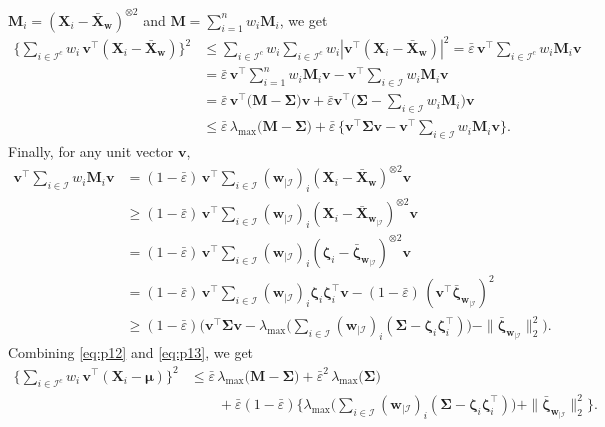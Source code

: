 \documentclass[aos,preprint,reqno]{imsart}
\newcommand\bs{\boldsymbol}
\newcommand\bmu{\boldsymbol\mu}
\newcommand\bzeta{\boldsymbol\zeta}
\newcommand\bSigma{\boldsymbol\Sigma}
\newcommand\bv{\boldsymbol v}
\newcommand\bw{\boldsymbol w}
\theoremstyle{plain}
\theoremstyle{remark}
\begin{document}
	$\mathbf M_i = (\bs X_i-\bar{\bs X}_{\bw})^{\otimes 2}$ and 
	$\mathbf M = \sum_{i=1}^n w_i\mathbf M_i$, we get
	\begin{align}
			\bigg\{\sum_{i\in\mathcal I^c} w_i\,\bv^\top(\bs X_i-\bar{\bs X}_{\bw})\bigg\}^2
			&\le \sum_{i\in\mathcal I^c} w_i\sum_{i\in\mathcal I^c} w_i|
				\bv^\top(\bs X_i-\bar{\bs X}_{\bw})|^2
			=\bar\varepsilon\, \bv^\top\sum_{i\in\mathcal I^c} w_i\mathbf{M}_i\bv\\
			&=\bar\varepsilon\,\bv^\top\sum_{i=1}^n w_i\mathbf{M}_i\bv-
			\bv^\top\sum_{i\in\mathcal I} w_i\mathbf{M}_i\bv\\
			&={\bar\varepsilon}\,\bv^\top\big(\mathbf{M} - \bSigma\big)\bv +
			{\bar\varepsilon}\bv^\top\Big(\bSigma-\sum_{i\in\mathcal I} w_i
			\mathbf{M}_i\Big)\bv\\
			&\le \bar\varepsilon\,\lambda_{\max}\big( \mathbf{M}-\bSigma\big)
			+ \bar\varepsilon\,\Big\{\bv^\top\bSigma\bv - 
			\bv^\top\sum_{i\in\mathcal I} w_i\mathbf{M}_i\bv\Big\}.
			\label{eq:p12}
	\end{align}
	Finally, for any unit vector $\bv$,
	\begin{align}
			\bv^\top\sum_{i\in\mathcal I} w_i\mathbf{M}_i \bv &= (1-\bar\varepsilon)
			\,\bv^\top\sum_{i\in\mathcal I} (\bw_{|\mathcal I})_i(\bs X_i-\bar{\bs X}_{\bw})^{\otimes 2}\bv\\
			&\ge(1-\bar\varepsilon)\,\bv^\top\sum_{i\in\mathcal I} (\bw_{|\mathcal I})_i
			(\bs X_i-\bar{\bs X}_{\bw_{|\mathcal I}})^{\otimes 2}\bv\\
			& = (1-\bar\varepsilon)\,\bv^\top\sum_{i\in\mathcal I} (\bw_{|\mathcal I})_i
			(\bzeta_i-\bar{\bzeta}_{\bw_{|\mathcal I}})^{\otimes 2}\bv\\
			&= (1-\bar\varepsilon)\,\bv^\top\sum_{i\in\mathcal I} (\bw_{|\mathcal I})_i
				\bzeta_i\bzeta_i^\top\bv-(1-\bar\varepsilon)\,
				(\bv^\top\bar{\bzeta}_{\bw_{|\mathcal I}})^2\\
			&\ge (1 -\bar\varepsilon)\bigg(\bv^\top\bSigma\bv - \lambda_{\max}
				\bigg(\sum_{i\in\mathcal I} (\bw_{|\mathcal I})_i (\bSigma-
				\bzeta_i\bzeta_i^\top)\bigg) - \|\bar{\bzeta}_{\bw_{|\mathcal I}}\|_2^2
				\bigg).
			 \label{eq:p13}
	\end{align}
	Combining \eqref{eq:p12} and \eqref{eq:p13}, we get
	\begin{align}
		\bigg\{\sum_{i\in\mathcal I^c} w_i\,\bv^\top(\bs X_i-\bmu)\bigg\}^2
				&\le \bar\varepsilon\,\lambda_{\max}\big( \mathbf{M}-\bSigma\big)
					+ \bar\varepsilon^2\,\lambda_{\max}\big(\bSigma\big) \\
				&\qquad +\bar\varepsilon(1-\bar\varepsilon)\bigg\{  \lambda_{\max}
					\bigg(\sum_{i\in\mathcal I} (\bw_{|\mathcal I})_i(\bSigma - 
					\bzeta_i\bzeta_i^\top)\bigg)  + 
					\|\bar{\bzeta}_{\bw_{|\mathcal I}}\|_2^2
					\bigg\}.\label{eq:p14}
	\end{align}
\end{document}
